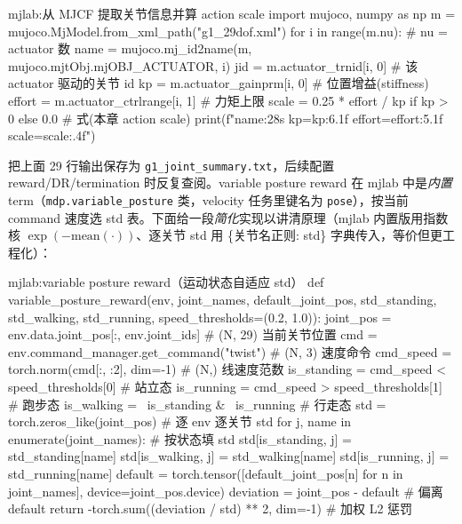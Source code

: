 \begin{codebox}[Python]{mjlab:从 MJCF 提取关节信息并算 action scale}
import mujoco, numpy as np
m = mujoco.MjModel.from_xml_path("g1_29dof.xml")
for i in range(m.nu):                                  # nu = actuator 数
    name = mujoco.mj_id2name(m, mujoco.mjtObj.mjOBJ_ACTUATOR, i)
    jid  = m.actuator_trnid[i, 0]                      # 该 actuator 驱动的关节 id
    kp     = m.actuator_gainprm[i, 0]                  # 位置增益(stiffness)
    effort = m.actuator_ctrlrange[i, 1]               # 力矩上限
    scale  = 0.25 * effort / kp if kp > 0 else 0.0     # 式(本章 action scale)
    print(f"{name:28s} kp={kp:6.1f} effort={effort:5.1f} scale={scale:.4f}")
\end{codebox}

把上面 29 行输出保存为 \texttt{g1\_joint\_summary.\allowbreak txt}，后续配置 reward/DR/termination 时反复查阅。\;variable posture reward 在 mjlab 中是\emph{内置} term（\texttt{mdp.\allowbreak variable\_posture} 类，velocity 任务里键名为 \texttt{pose}），按当前 command 速度选 std 表。下面给一段\emph{简化}实现以讲清原理（mjlab 内置版用指数核 $\exp(-\mathrm{mean}(\cdot))$、逐关节 std 用 \{关节名正则: std\} 字典传入，等价但更工程化）：

\begin{codebox}[Python]{mjlab:variable posture reward（运动状态自适应 std）}
def variable_posture_reward(env, joint_names, default_joint_pos,
                            std_standing, std_walking, std_running,
                            speed_thresholds=(0.2, 1.0)):
    joint_pos = env.data.joint_pos[:, env.joint_ids]          # (N, 29) 当前关节位置
    cmd = env.command_manager.get_command("twist")            # (N, 3) 速度命令
    cmd_speed = torch.norm(cmd[:, :2], dim=-1)                # (N,) 线速度范数
    is_standing = cmd_speed < speed_thresholds[0]             # 站立态
    is_running  = cmd_speed > speed_thresholds[1]             # 跑步态
    is_walking  = ~is_standing & ~is_running                  # 行走态
    std = torch.zeros_like(joint_pos)                         # 逐 env 逐关节 std
    for j, name in enumerate(joint_names):                    # 按状态填 std
        std[is_standing, j] = std_standing[name]
        std[is_walking,  j] = std_walking[name]
        std[is_running,  j] = std_running[name]
    default = torch.tensor([default_joint_pos[n] for n in joint_names],
                           device=joint_pos.device)
    deviation = joint_pos - default                           # 偏离 default
    return -torch.sum((deviation / std) ** 2, dim=-1)         # 加权 L2 惩罚
\end{codebox}


